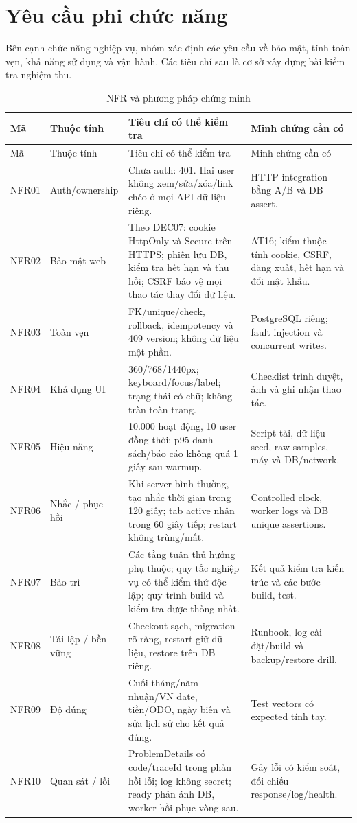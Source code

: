 \section{Yêu cầu phi chức năng}
Bên cạnh chức năng nghiệp vụ, nhóm xác định các yêu cầu về bảo mật, tính toàn vẹn, khả năng sử dụng và vận hành. Các tiêu chí sau là cơ sở xây dựng bài kiểm tra nghiệm thu.
\begin{smalltable}\begin{longtable}{L{1.3cm}L{3cm}L{6.2cm}L{4cm}}
\caption{NFR và phương pháp chứng minh}\label{tab:nfr}\\\toprule Mã & Thuộc tính & Tiêu chí có thể kiểm tra & Minh chứng cần có\\\midrule\endfirsthead
\toprule Mã & Thuộc tính & Tiêu chí có thể kiểm tra & Minh chứng cần có\\\midrule\endhead
NFR01 & Auth/ownership & Chưa auth: 401. Hai user không xem/sửa/xóa/link chéo ở mọi API dữ liệu riêng. & HTTP integration bằng A/B và DB assert.\\
NFR02 & Bảo mật web & Theo DEC07: cookie HttpOnly và Secure trên HTTPS; phiên lưu DB, kiểm tra hết hạn và thu hồi; CSRF bảo vệ mọi thao tác thay đổi dữ liệu. & AT16; kiểm thuộc tính cookie, CSRF, đăng xuất, hết hạn và đổi mật khẩu.\\
NFR03 & Toàn vẹn & FK/unique/check, rollback, idempotency và 409 version; không dữ liệu một phần. & PostgreSQL riêng; fault injection và concurrent writes.\\
NFR04 & Khả dụng UI & 360/768/1440px; keyboard/focus/label; trạng thái có chữ; không tràn toàn trang. & Checklist trình duyệt, ảnh và ghi nhận thao tác.\\
NFR05 & Hiệu năng & 10.000 hoạt động, 10 user đồng thời; p95 danh sách/báo cáo không quá 1 giây sau warmup. & Script tải, dữ liệu seed, raw samples, máy và DB/network.\\
NFR06 & Nhắc / phục hồi & Khi server bình thường, tạo nhắc thời gian trong 120 giây; tab active nhận trong 60 giây tiếp; restart không trùng/mất. & Controlled clock, worker logs và DB unique assertions.\\
NFR07 & Bảo trì & Các tầng tuân thủ hướng phụ thuộc; quy tắc nghiệp vụ có thể kiểm thử độc lập; quy trình build và kiểm tra được thống nhất. & Kết quả kiểm tra kiến trúc và các bước build, test.\\
NFR08 & Tái lập / bền vững & Checkout sạch, migration rõ ràng, restart giữ dữ liệu, restore trên DB riêng. & Runbook, log cài đặt/build và backup/restore drill.\\
NFR09 & Độ đúng & Cuối tháng/năm nhuận/VN date, tiền/ODO, ngày biên và sửa lịch sử cho kết quả đúng. & Test vectors có expected tính tay.\\
NFR10 & Quan sát / lỗi & ProblemDetails có code/traceId trong phản hồi lỗi; log không secret; ready phản ánh DB, worker hồi phục vòng sau. & Gây lỗi có kiểm soát, đối chiếu response/log/health.\\\bottomrule
\end{longtable}\end{smalltable}
